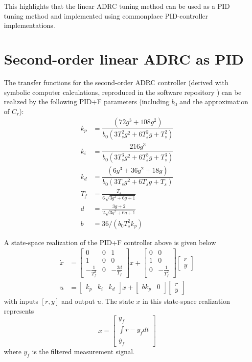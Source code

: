 \documentclass[letterpaper, 10 pt, conference]{ieeeconf}
\newcommand{\bmatrixx}[1]{\begin{bmatrix}#1\end{bmatrix}}
\begin{document}
This highlights that the linear ADRC tuning method can be used as a PID tuning method and implemented using commonplace PID-controller implementations.






\appendix

\section{Second-order linear ADRC as PID}
The transfer functions for the second-order ADRC controller (derived with symbolic computer calculations, reproduced in the software repository \cite{repo}) can be realized by the following PID+F parameters (including $b_0$ and the approximation of $C_r$):
\begin{align}
	k_p &= \dfrac{(72g^3 + 108g^2)}{b_0 (3T_s^2 g^2 + 6T_s^2 g + T_s^2)} \\
	k_i &= \dfrac{216g^3}{b_0 (3T_s^3 g^2 + 6T_s^3 g + T_s^3)} \\
	k_d &= \dfrac{(6g^3 + 36g^2 + 18g)}{b_0 (3T_s g^2 + 6T_s g + T_s)} \\
	T_f &= \frac{T_s}{6\sqrt{3g^2 + 6g + 1}} \\
	d &= \frac{3g + 2}{2\sqrt{3g^2 + 6g + 1}} \\
	b &= 36 / (b_0 T_s^2 k_p)
\end{align}

A state-space realization of the PID+F controller above is given below
\begin{align*}
	\dot{x} &= \left[\begin{matrix}0 & 0 & 1\\1 & 0 & 0\\- \frac{1}{T_{f}^{2}} & 0 & - \frac{2 d}{T_{f}}\end{matrix}\right]x + \left[\begin{matrix}0 & 0\\1 & 0\\0 & - \frac{1}{T_{f}^{2}}\end{matrix}\right]\bmatrixx{r \\ y} \\
	u &= \left[\begin{matrix}k_{p} & k_{i} & k_{d}\end{matrix}\right]x + \left[\begin{matrix}b k_{p} & 0\end{matrix}\right]\bmatrixx{r \\ y}
\end{align*}
with inputs $[r, y]$ and output $u$. The state $x$ in this state-space realization represents
$$ x = \bmatrixx{y_f \\ \int r - y_f dt \\ \dot{y_f}}$$
where $y_f$ is the filtered measurement signal.
\end{document}
